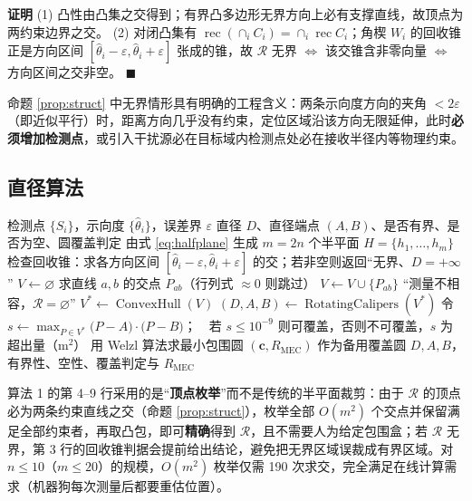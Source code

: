 \documentclass[withoutpreface,bwprint]{cumcmthesis}
\newenvironment{pf}{\par\noindent\textbf{证明}\quad}{\hfill$\blacksquare$\par}
\begin{document}
\begin{pf}
(1) 凸性由凸集之交得到；有界凸多边形无界方向上必有支撑直线，故顶点为两约束边界之交。
(2) 对闭凸集有 $\operatorname{rec}(\cap_i C_i)=\cap_i\operatorname{rec}C_i$；角楔 $W_i$ 的回收锥正是方向区间 $[\hat\theta_i-\varepsilon,\hat\theta_i+\varepsilon]$ 张成的锥，故 $\mathcal{R}$ 无界 $\iff$ 该交锥含非零向量 $\iff$ 方向区间之交非空。
\end{pf}

命题 \ref{prop:struct} 中无界情形具有明确的工程含义：两条示向度方向的夹角 $<2\varepsilon$（即近似平行）时，距离方向几乎没有约束，定位区域沿该方向无限延伸，此时\textbf{必须增加检测点}，或引入干扰源必在目标域内检测点处必在接收半径内等物理约束。

\subsection{直径算法}

\begin{algorithm}[H]
\caption{交会定位区域直径算法（$\mathcal{R}$-Diameter）}
\begin{algorithmic}[1]
\Require 检测点 $\{S_i\}$，示向度 $\{\hat\theta_i\}$，误差界 $\varepsilon$
\Ensure 直径 $D$、直径端点 $(A,B)$、是否有界、是否为空、圆覆盖判定
\State 由式 \eqref{eq:halfplane} 生成 $m=2n$ 个半平面 $H=\{h_1,\dots,h_m\}$
\State 检查回收锥：求各方向区间 $[\hat\theta_i-\varepsilon,\hat\theta_i+\varepsilon]$ 的交；若非空则返回“无界、$D=+\infty$”
\State $V\gets\varnothing$
 
   \State 求直线 $a,b$ 的交点 $P_{ab}$（行列式 $\approx0$ 则跳过）
      \State $V\gets V\cup\{P_{ab}\}$
   \EndIf
\EndFor
{} \State \Return “测量不相容，$\mathcal{R}=\varnothing$”
\EndIf
\State $V^*\gets\operatorname{ConvexHull}(V)$ 
\State $(D,A,B)\gets\operatorname{RotatingCalipers}(V^*)$ 
\State 令 $s\gets\max_{P\in V^*}\bigl(P-A\bigr)\cdot\bigl(P-B\bigr)$；\ \ 若 $s\le10^{-9}$ 则可覆盖，否则不可覆盖，$s$ 为超出量（m$^2$）
\State 用 Welzl 算法求最小包围圆 $(\mathbf c,R_{\mathrm{MEC}})$ 作为备用覆盖圆
\State \Return $D,A,B$，有界性、空性、覆盖判定与 $R_{\mathrm{MEC}}$
\end{algorithmic}
\end{algorithm}

算法 1 的第 4--9 行采用的是“\textbf{顶点枚举}”而不是传统的半平面裁剪：由于 $\mathcal{R}$ 的顶点必为两条约束直线之交（命题 \ref{prop:struct}），枚举全部 $O(m^2)$ 个交点并保留满足全部约束者，再取凸包，即可\textbf{精确}得到 $\mathcal{R}$，且不需要人为给定包围盒；若 $\mathcal{R}$ 无界，第 3 行的回收锥判据会提前给出结论，避免把无界区域误裁成有界区域。对 $n\le10$（$m\le20$）的规模，$O(m^2)$ 枚举仅需 190 次求交，完全满足在线计算需求（机器狗每次测量后都要重估位置）。
\end{document}
